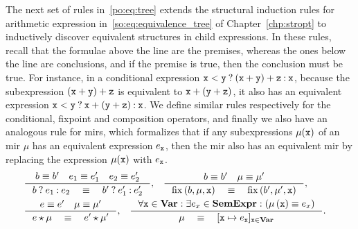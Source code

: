 The next set of rules in~\eqref{po:eq:tree} extends the structural induction
rules for arithmetic expression in~\eqref{so:eq:equivalence_tree} of
Chapter~\ref{chp:stropt} to inductively discover equivalent structures in child
expressions.  In these rules, recall that the formulae above the line are the
premises, whereas the ones below the line are conclusions, and if the premise
is true, then the conclusion must be true.  For instance, in a conditional
expression $\texttt{x} < \texttt{y}\mathbin{?}(\texttt{x} + \texttt{y}) + \texttt{z}\mathbin{:}\texttt{x}$, because
the subexpression $(\texttt{x} + \texttt{y}) + \texttt{z}$ is equivalent to $\texttt{x} + (\texttt{y}
+ \texttt{z})$, it also has an equivalent expression $\texttt{x} < \texttt{y}\mathbin{?}\texttt{x}
+ (\texttt{y} + \texttt{z})\mathbin{:}\texttt{x}$.  We define similar rules respectively for the
conditional, fixpoint and composition operators, and finally we also have an
analogous rule for \glspl{mir}, which formalizes that if any subexpressions
$\mu(\texttt{x})$ of an \gls{mir} $\mu$ has an equivalent expression $e_{\texttt{x}}$, then
the \gls{mir} also has an equivalent \gls{mir} by replacing the expression
$\mu(\texttt{x})$ with $e_{\texttt{x}}$.
\begin{equation}
    \begin{aligned}
    &
    \begin{aligned}
        \inference{%
            b \eqrel b^\prime \quad
            e_1 \eqrel e^\prime_1 \quad
            e_2 \eqrel e^\prime_2
        }{%
            \select{b}{e_1}{e_2} \quad \eqrel \quad
            \select{b^\prime}{e^\prime_1}{e^\prime_2}
        },
        & \quad
        \inference{%
            b \eqrel b^\prime \quad
            \mu \eqrel \mu^\prime
        }{%
            \fix\left(b, \mu, \varx\right) \quad \eqrel \quad
            \fix\left(b^\prime, \mu^\prime, \varx\right)
        },
    \end{aligned} \\
    &
    \begin{aligned}
        \inference{%
            e \eqrel e^\prime \quad
            \mu \eqrel \mu^\prime
        }{%
            e \expand \mu \quad \eqrel \quad e^\prime \expand \mu^\prime
        },
        & \quad
        \inference{%
            \forall \varx \in \varset:
            \exists e_x \in \sexprset:
            \left( \mu\left(\varx\right) \eqrel e_x \right)
        }{%
            \mu \quad \eqrel \quad [\varx \mapsto e_\varx]_{\varx \in \varset}
        }.
    \end{aligned}
    \end{aligned}
    \label{po:eq:tree}
\end{equation}


